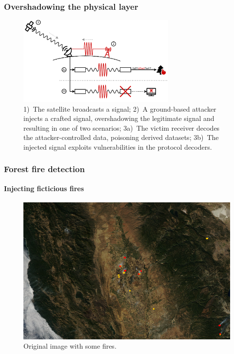 \documentclass{beamer}
\begin{document}
\begin{frame}
  \frametitle{Overshadowing the physical layer}
  \begin{figure}
      \centering
      \includegraphics[width=0.7\textwidth]{images/attack_illustration.pdf}
      \caption{1)~The satellite broadcasts a signal; 2)~A ground-based attacker injects a crafted signal, overshadowing the legitimate signal and resulting in one of two scenarios; 3a)~The victim receiver decodes the attacker-controlled data, poisoning derived datasets; 3b)~The injected signal exploits vulnerabilities in the protocol decoders.}
      \label{fig:attack-illustration}
  \end{figure}
\end{frame}

\begin{frame}
  \frametitle{Forest fire detection}
  \framesubtitle{Injecting ficticious fires}

  \begin{figure}
    \includegraphics[width=\textwidth]{images/injection/original.jpg}
    \caption{Original image with some fires.}
    \label{fig:injection-orig}
  \end{figure}
\end{frame}
\end{document}
